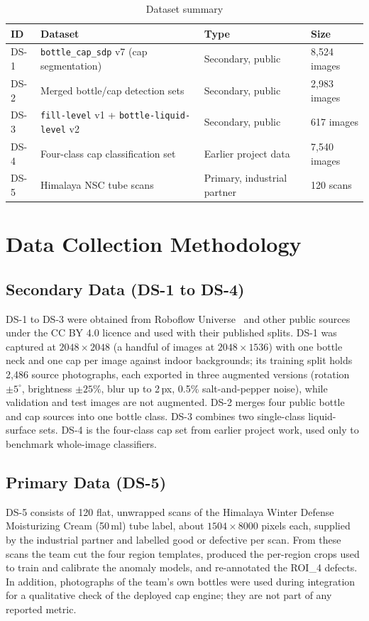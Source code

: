 \begin{table}[htbp]
\centering
\caption{Dataset summary}
\label{tab:ds-summary}
\begin{tabularx}{\textwidth}{|L{1.2cm}|X|L{3.2cm}|L{2.6cm}|}
\hline
\textbf{ID} & \textbf{Dataset} & \textbf{Type} & \textbf{Size} \\ \hline
DS-1 & \texttt{bottle\_cap\_sdp} v7 (cap segmentation) & Secondary, public & 8,524 images \\ \hline
DS-2 & Merged bottle/cap detection sets & Secondary, public & 2,983 images \\ \hline
DS-3 & \texttt{fill-level} v1 + \texttt{bottle-liquid-level} v2 & Secondary, public & 617 images \\ \hline
DS-4 & Four-class cap classification set & Earlier project data & 7,540 images \\ \hline
DS-5 & Himalaya NSC tube scans & Primary, industrial partner & 120 scans \\ \hline
\end{tabularx}
\end{table}

\section{Data Collection Methodology}

\subsection{Secondary Data (DS-1 to DS-4)}
DS-1 to DS-3 were obtained from Roboflow Universe~\cite{roboflowcap,fillds1,fillds2} and other public sources under the CC BY 4.0 licence and used with their published splits. DS-1 was captured at $2048{\times}2048$ (a handful of images at $2048{\times}1536$) with one bottle neck and one cap per image against indoor backgrounds; its training split holds 2,486 source photographs, each exported in three augmented versions (rotation $\pm5^\circ$, brightness $\pm25\%$, blur up to 2\,px, 0.5\% salt-and-pepper noise), while validation and test images are not augmented. DS-2 merges four public bottle and cap sources into one bottle class. DS-3 combines two single-class liquid-surface sets. DS-4 is the four-class cap set from earlier project work, used only to benchmark whole-image classifiers.

\subsection{Primary Data (DS-5)}
DS-5 consists of 120 flat, unwrapped scans of the Himalaya Winter Defense Moisturizing Cream (50\,ml) tube label, about $1504{\times}8000$ pixels each, supplied by the industrial partner and labelled good or defective per scan. From these scans the team cut the four region templates, produced the per-region crops used to train and calibrate the anomaly models, and re-annotated the ROI\_4 defects. In addition, photographs of the team's own bottles were used during integration for a qualitative check of the deployed cap engine; they are not part of any reported metric.

